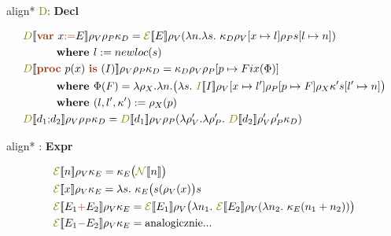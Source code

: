 \documentclass{article}
\newcommand{\sembr}[1]{[\![#1]\!]}
\newcommand{\syn}[1]{{\bf \textcolor{RawSienna}{#1}}}
\newcommand{\sem}[1]{{\bf \textcolor{olive}{#1}}}
\newcommand{\semcol}[1]{{\textcolor{olive}{#1}}}
\newcommand{\boxedeq}[1]{\begin{empheq}[box={\fboxsep=6pt\fbox}]{align*}#1\end{empheq}}
\newcommand{\bigeps}{\mathcal{E}}
\begin{document}
\boxedeq{ \semcol{D}: \syn{Decl} \to \sem{DECL} }
\begin{align*}
	  & \semcol{D}\sembr{\syn{var} \ x \syn{:=} E} \rho_V \rho_P \kappa_D = \semcol{\bigeps} \sembr{E} \rho_V (\lambda n. \lambda s. \ \kappa_D \rho_V[x\mapsto l] \rho_P s[l\mapsto n])         \\
	  & \ \ \ \ \ \ \ \ \textbf{ where } l := newloc(s)                                                                                                                                          \\
	  & \semcol{D}\sembr{\syn{proc} \ p(x) \ \syn{is} \ (I)} \rho_V \rho_P \kappa_D = \kappa_D \rho_V \rho_P[p\mapsto Fix(\Phi)]                                                                 \\
	  & \ \ \ \ \ \ \ \ \textbf{ where } \Phi(F) = \lambda \rho_X. \lambda n. \bigl( \lambda s. \ \semcol{I}\sembr{I}\rho_V[x\mapsto l'] \rho_P[p \mapsto F] \rho_X \kappa' s[l'\mapsto n]\bigr) \\
	  & \ \ \ \ \ \ \ \ \textbf{ where } (l,l',\kappa') := \rho_X(p)                                                                                                                             \\
	  & \semcol{D}\sembr{d_1 \syn{;} d_2} \rho_V \rho_P \kappa_D = \semcol{D}\sembr{d_1}\rho_V \rho_P (\lambda \rho'_V. \lambda \rho'_P. \ \semcol{D} \sembr{d_2}\rho'_V \rho'_P \kappa_D)       \\
\end{align*}

\boxedeq{ \semcol{\bigeps}: \syn{Expr} \to \sem{EXPR} }
\begin{align*}
	  & \semcol{\bigeps}\sembr{n} \rho_V \kappa_E = \kappa_E\bigl(\semcol{\mathcal{N}}\sembr{n}\bigr) \\
	  & \semcol{\bigeps}\sembr{x} \rho_V \kappa_E = \lambda s. \  \kappa_E\bigl(s(\rho_V(x)\bigr)s    \\
	  & \semcol{\bigeps}\sembr{E_1 \syn{+} E_2} \rho_V \kappa_E = \semcol{\bigeps}\sembr{E_1}\rho_V
	\bigl( \lambda n_1. \ \semcol{\bigeps}\sembr{E_2}\rho_V (\lambda n_2. \ \kappa_E (n_1 + n_2)) \bigr) \\
	  & \semcol{\bigeps}\sembr{E_1 \syn{-} E_2} \rho_V \kappa_E = \text{analogicznie...}              \\
\end{align*}
\end{document}
